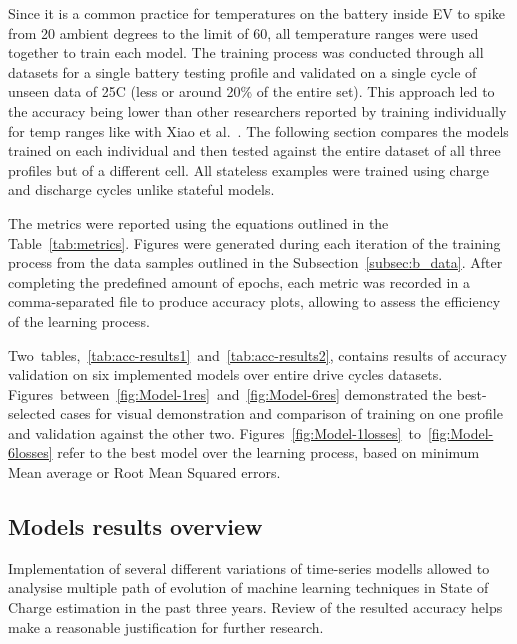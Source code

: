 Since it is a common practice for temperatures on the battery inside EV to spike from 20 ambient degrees to the limit of 60, all temperature ranges were used together to train each model.
The training process was conducted through all datasets for a single battery testing profile and validated on a single cycle of unseen data of 25\textdegree{}C (less or around 20\% of the entire set).
This approach led to the accuracy being lower than other researchers reported by training individually for temp ranges like with Xiao et al.~\cite{xiao_accurate_2019}.
The following section compares the models trained on each individual and then tested against the entire dataset of all three profiles but of a different cell.
All stateless examples were trained using charge and discharge cycles unlike stateful models.

%
%
The metrics were reported using the equations outlined in the \mbox{Table~\ref{tab:metrics}}.
Figures were generated during each iteration of the training process from the data samples outlined in the \mbox{Subsection~\ref{subsec:b_data}}.
After completing the predefined amount of epochs, each metric was recorded in a comma-separated file to produce accuracy plots, allowing to assess the efficiency of the learning process.

%
%
\mbox{Two tables, \ref{tab:acc-results1} and \ref{tab:acc-results2}}, contains results of accuracy validation on six implemented models over entire drive cycles datasets.
\mbox{Figures between \ref{fig:Model-1res} and \ref{fig:Model-6res}} demonstrated the best-selected cases for visual demonstration and comparison of training on one profile and validation against the other two.
\mbox{Figures \ref{fig:Model-1losses} to \ref{fig:Model-6losses}} refer to the best model over the learning process, based on minimum Mean average or Root Mean Squared errors.

%
%
\subsection{Models results overview}
Implementation of several different variations of time-series modells allowed to analysise multiple path of evolution of machine learning techniques in State of Charge estimation in the past three years.
Review of the resulted accuracy helps make a reasonable justification for further research.


